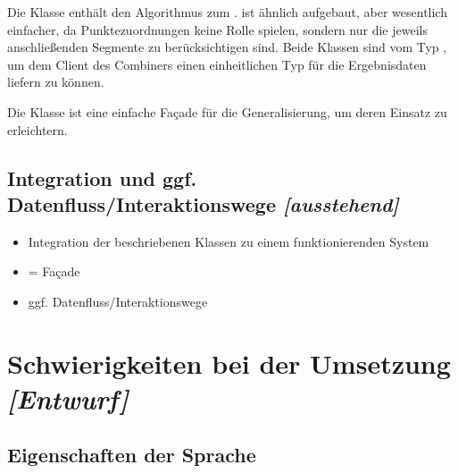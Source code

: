 \documentclass[../main/thesis.tex]{subfiles}
\begin{document}
Die Klasse  enthält den Algorithmus zum .
 ist ähnlich aufgebaut, aber wesentlich einfacher, da Punktezuordnungen keine Rolle spielen, sondern nur die jeweils anschließenden Segmente zu berücksichtigen sind.
Beide Klassen sind vom Typ , um dem Client des Combiners einen einheitlichen Typ für die Ergebnisdaten liefern zu können.

Die Klasse  ist eine einfache Façade für die Generalisierung, um deren Einsatz zu erleichtern.



\subsection{Integration und ggf. Datenfluss/Interaktionswege \emph{[ausstehend]}}

\begin{itemize}
\item Integration der beschriebenen Klassen zu einem funktionierenden System
\item {} = Façade
\item ggf. Datenfluss/Interaktionswege
\end{itemize}



\section{Schwierigkeiten bei der Umsetzung \emph{[Entwurf]}}
\label{ch:impl-difficulties}






\subsection{Eigenschaften der Sprache}
\end{document}
